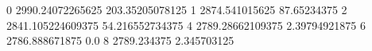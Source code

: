 0 2990.24072265625 203.35205078125
1 2874.541015625 87.65234375
2 2841.105224609375 54.216552734375
4 2789.28662109375 2.39794921875
6 2786.888671875 0.0
8 2789.234375 2.345703125
